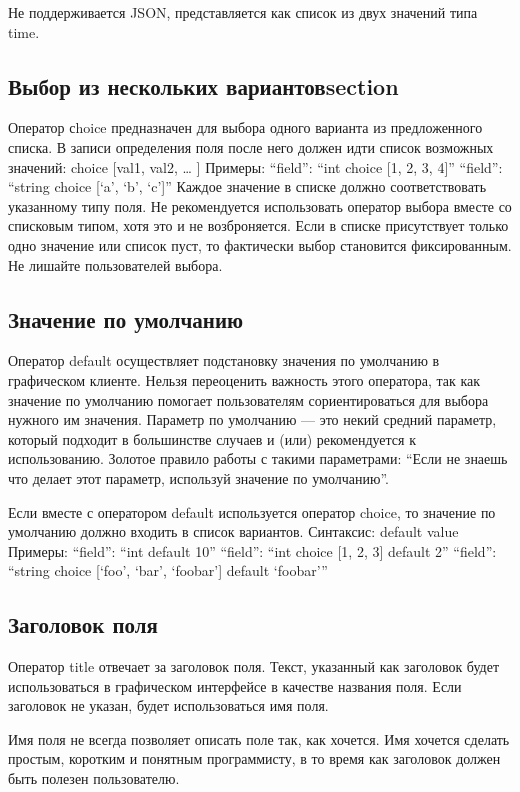 {{Не поддерживается JSON, представляется как список из двух значений типа time.

\subsection{Выбор из нескольких вариантовsection}

Оператор сhoice предназначен для выбора одного варианта из предложенного списка. В записи определения поля после него должен идти список возможных значений:
choice [val1, val2, … ]
Примеры:
        “field”: “int choice [1, 2, 3, 4]”
        “field”: “string choice [‘a’, ‘b’, ‘c’]”
Каждое значение в списке должно соответствовать указанному типу поля. Не рекомендуется использовать оператор выбора вместе со списковым типом, хотя это и не возброняется.
Если в списке присутствует только одно значение или список пуст, то фактически выбор становится фиксированным. Не лишайте пользователей выбора.

\subsection{Значение по умолчанию}

Оператор default осуществляет подстановку значения по умолчанию в графическом клиенте. Нельзя переоценить важность этого оператора, так как значение по умолчанию помогает пользователям сориентироваться для выбора нужного им значения. Параметр по умолчанию — это некий средний параметр, который подходит в большинстве случаев и (или) рекомендуется к использованию. Золотое правило работы с такими параметрами: “Если не знаешь что делает этот параметр, используй значение по умолчанию”.

Если вместе с оператором default используется оператор choice, то значение по умолчанию должно входить в список вариантов.
Синтаксис:
        default value
Примеры:
“field”: “int default 10”
“field”: “int choice [1, 2, 3] default 2”
“field”: “string choice [‘foo’, ‘bar’, ‘foobar’]
default ‘foobar’”

\subsection{Заголовок поля}
Оператор title отвечает за заголовок поля. Текст, указанный как заголовок будет использоваться в графическом интерфейсе в качестве названия поля. Если заголовок не указан, будет использоваться имя поля.

Имя поля не всегда позволяет описать поле так, как хочется. Имя хочется сделать простым, коротким и понятным программисту, в то время как заголовок должен быть полезен пользователю.

}}
